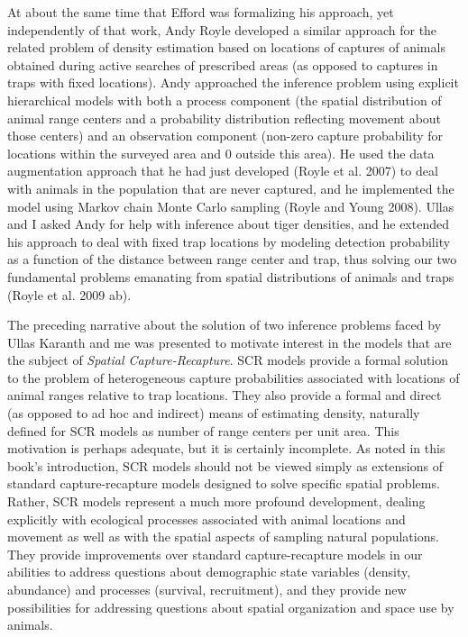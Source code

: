 At about
the same time that Efford was formalizing his approach, yet
independently of that work, Andy Royle developed a similar approach
for the related problem of density estimation based on locations of
captures of animals obtained during active searches of prescribed
areas (as opposed to captures in traps with fixed locations). Andy
approached the inference problem using explicit hierarchical models
with both a process component (the spatial distribution of animal
range centers and a probability distribution reflecting movement about
those centers) and an observation component (non-zero capture
probability for locations within the surveyed area and 0 outside this
area). He used the data augmentation approach that he had just
developed (Royle et al. 2007) to deal with animals in the population
that are never captured, and he implemented the model using Markov
chain Monte Carlo sampling (Royle and Young 2008).  Ullas and I asked
Andy for help with inference about tiger densities, and he extended
his approach to deal with fixed trap locations by modeling detection
probability as a function of the distance between range center and
trap, thus solving our two fundamental problems emanating from spatial
distributions of animals and traps (Royle et al. 2009 ab).  

The
preceding narrative about the solution of two inference problems faced
by Ullas Karanth and me was presented to motivate interest in the
models that are the subject of {\it Spatial Capture-Recapture}. SCR models
provide a formal solution to the problem of heterogeneous capture
probabilities associated with locations of animal ranges relative to
trap locations. They also provide a formal and direct (as opposed to
ad hoc and indirect) means of estimating density, naturally defined
for SCR models as number of range centers per unit area.  This
motivation is perhaps adequate, but it is certainly incomplete. As
noted in this book's introduction, SCR models should not be viewed
simply as extensions of standard capture-recapture models designed to
solve specific spatial problems. Rather, SCR models represent a much
more profound development, dealing explicitly with ecological
processes associated with animal locations and movement as well as
with the spatial aspects of sampling natural populations. They provide
improvements over standard capture-recapture models in our abilities
to address questions about demographic state variables (density,
abundance) and processes (survival, recruitment), and they provide new
possibilities for addressing questions about spatial organization and
space use by animals.  

